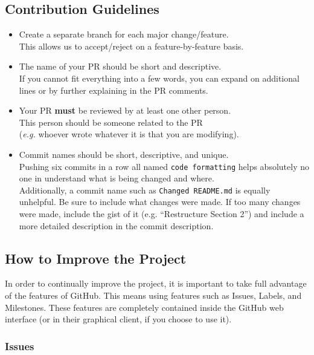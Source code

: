 \documentclass{article}
\begin{document}
\subsection{Contribution Guidelines}

\begin{itemize}
	\item Create a separate branch for each major change/feature.
		\\This allows us to accept/reject on a feature-by-feature basis.
	
	\item The name of your PR should be short and descriptive.
		\\If you cannot fit everything into a few words, you can expand on additional lines or by further explaining in the PR comments.
	
	\item Your PR \textbf{must} be reviewed by at least one other person.
		\\This person should be someone related to the PR 
		\\(\textit{e.g.} whoever wrote whatever it is that you are modifying).
	\item Commit names should be short, descriptive, and unique.
		\\Pushing six commits in a row all named \texttt{code formatting} helps absolutely no one in understand what is being changed and where.
		\\Additionally, a commit name such as \texttt{Changed README.md} is equally unhelpful. Be sure to include what changes were made.
		If too many changes were made, include the gist of it (e.g. ``Restructure Section 2'') and include a more detailed description in the commit description.
\end{itemize}

\pagebreak

\subsection{How to Improve the Project}

In order to continually improve the project, it is important to take full advantage of the features of GitHub.
This means using features such as Issues, Labels, and Milestones.
These features are completely contained inside the GitHub web interface (or in their graphical client, if you choose to use it).

\subsubsection{Issues}
\end{document}
